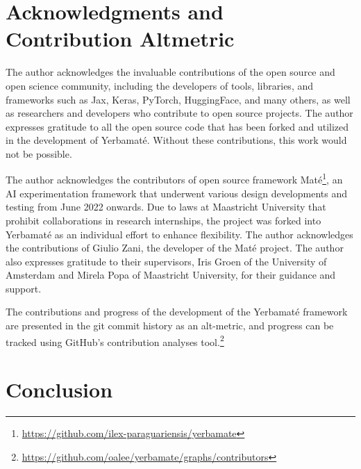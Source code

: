 

\section{Acknowledgments and Contribution Alt\-metric}

The author acknowledges the invaluable contributions of the open source and open science community, including the developers of tools, libraries, and frameworks such as Jax, Keras, PyTorch, HuggingFace, and many others, as well as researchers and developers who contribute to open source projects. The author expresses gratitude to all the open source code that has been forked and utilized in the development of Yerbamaté. Without these contributions, this work would not be possible.


The author acknowledges the contributors of open source framework Maté\footnote{\url{https://github.com/ilex-paraguariensis/yerbamate}}, an AI experimentation framework that underwent various design developments and testing from June 2022 onwards. Due to laws at Maastricht University that prohibit collaborations in research internships, the project was forked into Yerbamaté as an individual effort to enhance flexibility. The author acknowledges the contributions of Giulio Zani, the developer of the Maté project.
The author also expresses gratitude to their supervisors, Iris Groen of the University of Amsterdam and Mirela Popa of Maastricht University, for their guidance and support. 


The contributions and progress of the development of the Yerbamaté framework are presented in the git commit history as an alt-metric, and progress can be tracked using GitHub's contribution analyses tool.\footnote{\url{https://github.com/oalee/yerbamate/graphs/contributors}}



\section{Conclusion}





